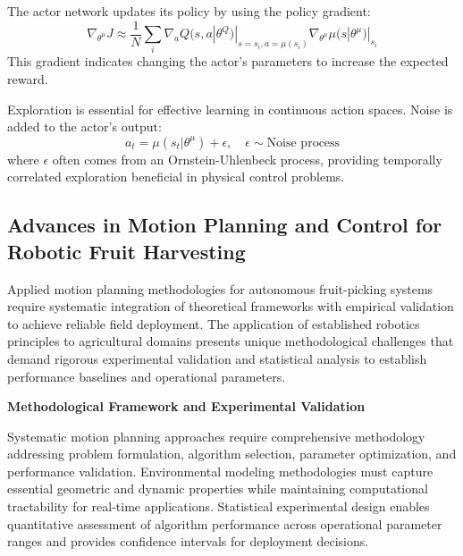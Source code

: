 \documentclass[pdflatex,sn-mathphys-num]{sn-jnl}
\begin{document}
The actor network updates its policy by using the policy gradient:
\begin{equation}
\nabla_{\theta^\mu} J \approx \frac{1}{N} \sum_i \nabla_a Q(s, a | \theta^Q)|_{s=s_i, a=\mu(s_i)} \nabla_{\theta^\mu} \mu(s | \theta^\mu)|_{s_i}
\end{equation}
This gradient indicates changing the actor's parameters to increase the expected reward.

Exploration is essential for effective learning in continuous action spaces. Noise is added to the actor's output:
\begin{equation}
a_t = \mu(s_t|\theta^\mu) + \epsilon, \quad \epsilon \sim \text{Noise process}
\end{equation}
where \( \epsilon \) often comes from an Ornstein-Uhlenbeck process, providing temporally correlated exploration beneficial in physical control problems.

\subsection{Advances in Motion Planning and Control for Robotic Fruit Harvesting}

Applied motion planning methodologies for autonomous fruit-picking systems require systematic integration of theoretical frameworks with empirical validation to achieve reliable field deployment. The application of established robotics principles to agricultural domains presents unique methodological challenges that demand rigorous experimental validation and statistical analysis to establish performance baselines and operational parameters.

\textbf{Methodological Framework and Experimental Validation}

Systematic motion planning approaches require comprehensive methodology addressing problem formulation, algorithm selection, parameter optimization, and performance validation. Environmental modeling methodologies must capture essential geometric and dynamic properties while maintaining computational tractability for real-time applications. Statistical experimental design enables quantitative assessment of algorithm performance across operational parameter ranges and provides confidence intervals for deployment decisions.
\end{document}
